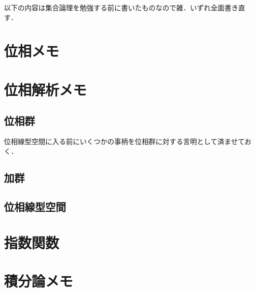 \documentclass[a4j,10.5pt,oneside,openany]{jsbook}
\theoremstyle{mystyle}
\begin{document}
\newpage	
以下の内容は集合論理を勉強する前に書いたものなので雑．いずれ全面書き直す．
\chapter{位相メモ}
	
	
	
	
	
	
	
	
	

\chapter{位相解析メモ}
	\section{位相群}
		位相線型空間に入る前にいくつかの事柄を位相群に対する言明として済ませておく．
		
		
		
	\section{加群}
		
		
	\section{位相線型空間}
		
		
		
		
		
		

\chapter{指数関数}
		
		
		
		
		
		
		
		

\chapter{積分論メモ}
	
	
	
	
	
	
	
	
	
	
	
\end{document}
